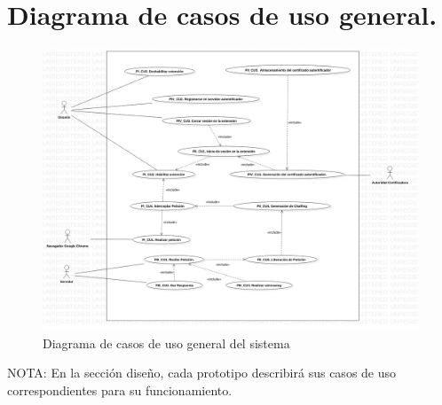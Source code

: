 \documentclass[12pt, a4paper, titlepage]{report}
\begin{document}
	    \section{Diagrama de casos de uso general.}
	         \begin{figure}[H]
        		\begin{center}
        		\includegraphics[width=13cm]{./imagenes/Analisis/UCD_General.png}
        		\caption{Diagrama de casos de uso general del sistema}
	            \end{center}
	        \end{figure}   
	        
	        NOTA: En la sección diseño, cada prototipo describirá sus casos de uso correspondientes para su funcionamiento.
	
		
    
\end{document}

